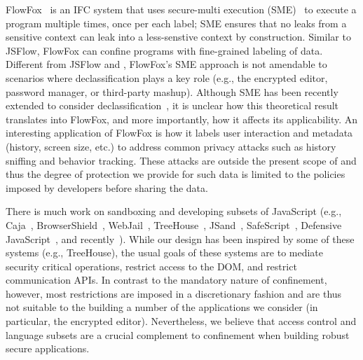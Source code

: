 FlowFox~\cite{DeGroef:2012} is an IFC system that uses secure-multi
execution (SME)~\cite{Devriese:2010} to execute a program multiple
times, once per each label; SME ensures that no leaks from a sensitive
context can leak into a less-senstive context by construction.
%
Similar to JSFlow, FlowFox can confine programs
with fine-grained labeling of data.
%
Different from JSFlow and \sys{}, FlowFox's SME approach is not
amendable to scenarios where declassification plays
a key role (e.g., the encrypted editor, password manager, or
third-party mashup). 
%
Although SME has been recently extended to consider
declassification~\cite{Rafnsson:2013}, it is unclear how this
theoretical result translates into FlowFox, and more importantly, how
it affects its applicability.
%
An interesting application of FlowFox is how it labels user interaction and metadata
(history, screen size, etc.) to address common privacy attacks such as
history sniffing and behavior tracking.
%
These attacks are outside the present scope of \sys{} and thus the
degree of protection we provide for such data is limited to the
policies imposed by developers before sharing the data.

%



There is much work on sandboxing and developing subsets of JavaScript (e.g.,
Caja~\cite{GoogleCaja}, BrowserShield~\cite{Reis:2007},
WebJail~\cite{VanAcker:2011}, TreeHouse~\cite{Ingram:2012},
JSand~\cite{Agten:2012:JCC}, SafeScript~\cite{SafeScript}, Defensive
JavaScript~\cite{djs}, and recently~\cite{Howell:2013}). 
%
While our design has been inspired by some of these systems (e.g., TreeHouse), the
usual goals of these systems are to mediate security
critical operations, restrict access to the DOM, and restrict communication APIs\@.
%
In contrast to the mandatory nature of confinement, however, most restrictions
are imposed in a discretionary fashion and are thus not suitable to the
building a number of the applications we consider (in particular, the encrypted
editor).
%
Nevertheless, we believe that access control and language subsets are a crucial
complement to confinement when building robust secure applications.



